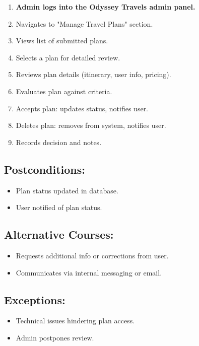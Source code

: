 \documentclass{scrreprt}
\begin{document}
\begin{enumerate}
    \item \textbf{Admin logs into the Odyssey Travels admin panel.}
    \item Navigates to "Manage Travel Plans" section.
    \item Views list of submitted plans.
    \item Selects a plan for detailed review.
    \item Reviews plan details (itinerary, user info, pricing).
    \item Evaluates plan against criteria.
    \item Accepts plan: updates status, notifies user.
    \item Deletes plan: removes from system, notifies user.
    \item Records decision and notes.
\end{enumerate}

\subsection*{\textbf{Postconditions:}}

\begin{itemize}
    \item Plan status updated in database.
    \item User notified of plan status.
\end{itemize}

\subsection*{\textbf{Alternative Courses:}}

\begin{itemize}
    \item Requests additional info or corrections from user.
    \item Communicates via internal messaging or email.
\end{itemize}

\subsection*{\textbf{Exceptions:}}

\begin{itemize}
    \item Technical issues hindering plan access.
    \item Admin postpones review.
\end{itemize}
\end{document}
